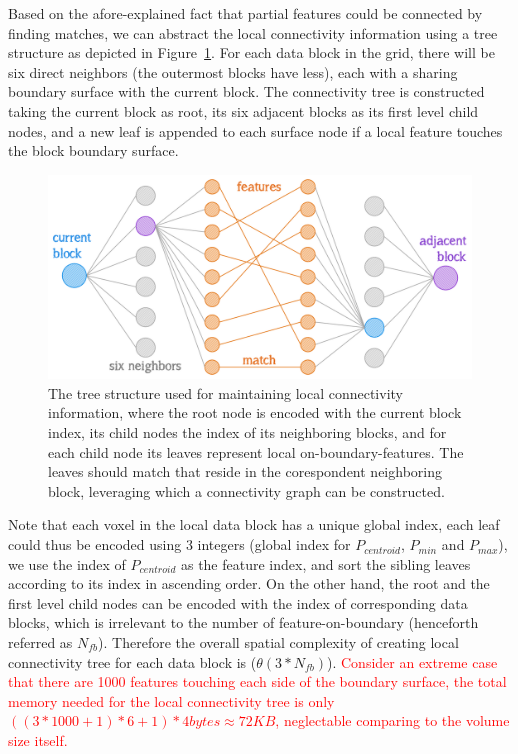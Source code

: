 \documentclass[10pt, conference, compsocconf]{IEEEtran}
\begin{document}
Based on the afore-explained fact that partial features could be connected by finding matches, we can abstract the local connectivity information using a tree structure as depicted in Figure~\ref{fig:match}. For each data block in the grid, there will be six direct neighbors (the outermost blocks have less), each with a sharing boundary surface with the current block. The connectivity tree is constructed taking the current block as root, its six adjacent blocks as its first level child nodes, and a new leaf is appended to each surface node if a local feature touches the block boundary surface. 

\begin{figure}[ht]
	\centering
	\includegraphics[width=1\linewidth]{match.png}
	\caption{The tree structure used for maintaining local connectivity information, where the root node is encoded with the current block index, its child nodes the index of its neighboring blocks, and for each child node its leaves represent local on-boundary-features. The leaves should match that reside in the corespondent neighboring block, leveraging which a connectivity graph can be constructed.}
	\label{fig:match}
\end{figure}

Note that each voxel in the local data block has a unique global index, each leaf could thus be encoded using 3 integers (global index for $P_{centroid}$, $P_{min}$ and $P_{max}$), we use the index of $P_{centroid}$ as the feature index, and sort the sibling leaves according to its index in ascending order. On the other hand, the root and the first level child nodes can be encoded with the index of corresponding data blocks, which is irrelevant to the number of feature-on-boundary (henceforth referred as $N_{fb}$). Therefore the overall spatial complexity of creating local connectivity tree for each data block is ($\theta(3*N_{fb})$). \textcolor{red}{Consider an extreme case that there are 1000 features touching each side of the boundary surface, the total memory needed for the local connectivity tree is only $((3*1000 + 1)*6 + 1) * 4 bytes \approx 72KB$, neglectable comparing to the volume size itself.}
\end{document}
